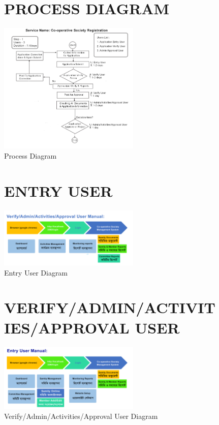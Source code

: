 \begin{figure}[h]
\section{PROCESS DIAGRAM}
  \centering
  \includegraphics[width=0.6\textwidth]{Chap3/3.png}
  \caption{Process Diagram}
  \label{fig:example}
\end{figure}

\begin{figure}[h]
\section{ENTRY USER}
  \centering
  \includegraphics[width=0.6\textwidth]{Chap3/4.png}
  \caption{Entry User Diagram}
  \label{fig:example}
\end{figure}

\begin{figure}[h]
\section{VERIFY/ADMIN/ACTIVITIES/APPROVAL USER }
  \centering
  \includegraphics[width=0.6\textwidth]{Chap3/5.png}
  \caption{Verify/Admin/Activities/Approval User Diagram}
  \label{fig:example}
\end{figure}

